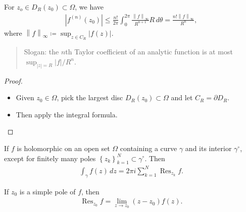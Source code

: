 \begin{theorem}

For \(z_o \in D_R(z_0) \subset \Omega\), we have
\begin{align*}
{\left\lvert { f^{(n)} (z_0) } \right\rvert} 
\leq \frac{n !}{2 \pi} \int_{0}^{2 \pi} \frac{ {\left\lVert {f} \right\rVert}_{\infty} } {R^{n+1}} R \,d\theta
= \frac{n !{\left\lVert {f} \right\rVert}_{\infty}}{R^n} 
,\end{align*}
where
\({\left\lVert {f} \right\rVert}_{\infty}\coloneqq\sup_{z\in C_R} {\left\lvert {f(z)} \right\rvert}\).

\begin{quote}
Slogan: the \(n\)th Taylor coefficient of an analytic function is at
most
\(\sup_{{\left\lvert {z} \right\rvert} = R} {\left\lvert {f} \right\rvert}/R^n\).
\end{quote}

\end{theorem}

\begin{proof}

\hfill

\begin{itemize}
\tightlist
\item
  Given \(z_0\in \Omega\), pick the largest disc
  \(D_R(z_0) \subset \Omega\) and let \(C_R = {{\partial}}D_R\).
\item
  Then apply the integral formula.
\end{itemize}

\end{proof}

\begin{theorem}

If \(f\) is holomorphic on an open set \(\Omega\) containing a curve
\(\gamma\) and its interior \(\gamma^\circ\), except for finitely many
poles \(\left\{{z_k}\right\}_{k=1}^N \subset \gamma^\circ\). Then
\begin{align*}  
\int_\gamma f(z) \,dz = 2\pi i \sum_{k=1}^N \operatorname{Res}_{z_k} f
.\end{align*}

\end{theorem}

\begin{proposition}

If \(z_0\) is a simple pole of \(f\), then
\begin{align*}  
\operatorname{Res}_{z_0}f = \lim_{z\to z_0} (z-z_0) f(z)
.\end{align*}

\end{proposition}

